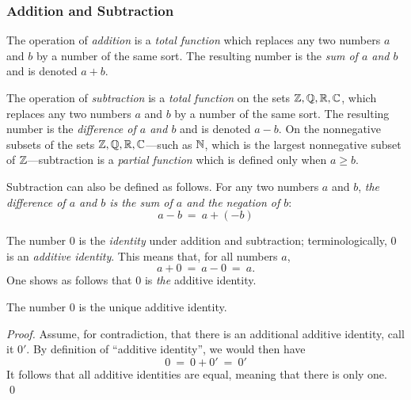 \subsubsection{Addition and Subtraction}
 

The operation of {\it addition} is a {\em total function} which replaces any two numbers $a$ and $b$ by a number of the same sort.  The resulting number is the {\em sum of $a$ and $b$} and is denoted $a+b$.

\smallskip

 
\noindent
The operation of {\it subtraction} is a {\em total function} on the sets $\mathbb{Z}, \mathbb{Q}, \mathbb{R}, \mathbb{C}$, which replaces any two numbers $a$ and $b$ by a number of the same sort.  The resulting number is the {\em difference of $a$ and $b$} and is denoted $a-b$.  On the nonnegative subsets of the sets $\mathbb{Z}, \mathbb{Q}, \mathbb{R}, \mathbb{C}$---such as $\mathbb{N}$, which is the largest nonnegative subset of $\mathbb{Z}$---subtraction is a {\em partial function} which is defined only when $a \geq b$.

\smallskip

Subtraction can also be defined as follows.  For any two numbers $a$ and $b$, {\em the difference of $a$ and $b$ is the sum of $a$ and the negation of $b$}:
\[ a-b \ = \ a + (-b) \]

\medskip


The number $0$ is the {\it identity} under addition and subtraction; terminologically, $0$ is an {\it additive identity}.  This means that, for all numbers $a$,
\[ a+0 \ = \ a-0 \ = \ a. \]
One shows as follows that $0$ is {\em the} additive identity.

\begin{prop}
\label{thm:unique-add-iden}
The number $0$ is the unique additive identity.
\end{prop}

\begin{proof}
Assume, for contradiction, that there is an additional additive identity, call it $0'$.  By definition of ``additive identity'', we would then have
\[ 0 \ = \ 0 + 0' \ = \ 0' \]
It follows that all additive identities are equal, meaning that there is only one.  \qed
\end{proof}

